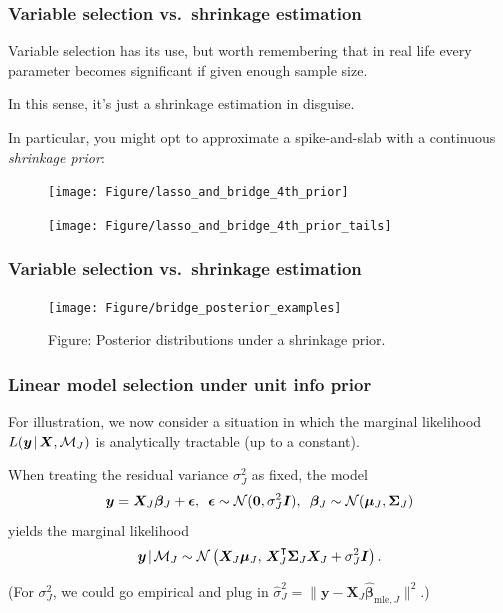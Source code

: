 \documentclass[18pt]{beamer}
\newcommand{\defineTightSpacing}{%
	\setlength{\abovedisplayskip}{.25\baselineskip}%
	\setlength{\belowdisplayskip}{.25\baselineskip}%
}
\newcommand{\given}{\mskip.7\thinmuskip | \mskip.7\thinmuskip}
\newcommand{\transpose}{\text{\raisebox{.5ex}{$\intercal$}}}
\newcommand{\normalDist}{\operatorname{\mathcal{N}}}
\newcommand{\likelihood}{L}
\newcommand{\by}{\bm{y}}
\newcommand{\bX}{\bm{X}}
\newcommand{\bmu}{\bm{\mu}}
\newcommand{\bbeta}{\bm{\beta}}
\newcommand{\bSigma}{\bm{\Sigma}}
\newcommand{\model}{\mathcal{M}}
\newcommand{\nonzeroCoefSet}{J}
\begin{document}
\begin{frame}
\frametitle{Variable selection vs.\ shrinkage estimation}

Variable selection has its use, but worth remembering that in real life every parameter becomes significant if given enough sample size.

In this sense, it's just a shrinkage estimation in disguise. 

In particular, you might opt to approximate a spike-and-slab with a continuous \textit{shrinkage prior}:

\vspace{-.3\baselineskip}
	\begin{figure}
		\begin{minipage}{.48\linewidth}
		\texttt{[image: Figure/lasso\_and\_bridge\_4th\_prior]}
		\end{minipage}
		\begin{minipage}{.48\linewidth}
			\texttt{[image: Figure/lasso\_and\_bridge\_4th\_prior\_tails]}
		\end{minipage}
	\end{figure} \vspace{-.3\baselineskip}

\end{frame}


\begin{frame}
\frametitle{Variable selection vs.\ shrinkage estimation}
\begin{figure}
\texttt{[image: Figure/bridge\_posterior\_examples]}
\caption*{\textcolor{themecolor}{Figure:}
	Posterior distributions under a shrinkage prior.
}
\end{figure}
\end{frame}


\begin{frame}
\frametitle{Linear model selection under unit info prior}
For illustration, we now consider a situation in which the marginal likelihood $\likelihood(\by \given \bX,  \model_\nonzeroCoefSet)$ is analytically tractable (up to a constant).

\smallskip
When treating the residual variance $\sigma_\nonzeroCoefSet^2$ as fixed, the model
\begin{equation*} \defineTightSpacing%
\by = \bX_\nonzeroCoefSet \bbeta_\nonzeroCoefSet + \bm{\epsilon}, \ \,
\bm{\epsilon} \sim \normalDist(\bm{0}, \sigma_\nonzeroCoefSet^2 \bm{I}), \ \,
\bbeta_\nonzeroCoefSet \sim \normalDist(\bmu_\nonzeroCoefSet, \bSigma_\nonzeroCoefSet)
\end{equation*}
yields the marginal likelihood
\begin{equation*} \defineTightSpacing%
\by \given \model_\nonzeroCoefSet \sim \normalDist\left(
	\bX_\nonzeroCoefSet \bmu_\nonzeroCoefSet, \,
	\bX_\nonzeroCoefSet^\transpose \bSigma_\nonzeroCoefSet \bX_\nonzeroCoefSet + \sigma_\nonzeroCoefSet^2 \bm{I}
\right).
\end{equation*}

(For $\sigma_\nonzeroCoefSet^2$, we could go empirical and plug in $\widehat{\sigma}_\nonzeroCoefSet^2 = \big\| \by - \bX_\nonzeroCoefSet \widehat{\bbeta}_{\textrm{mle}, \nonzeroCoefSet} \big\|^2$.)
\end{frame}
\end{document}
